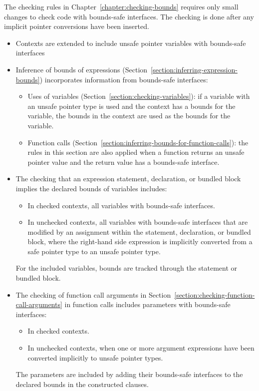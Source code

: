 The checking rules in Chapter~\ref{chapter:checking-bounds} requires
only small changes to check code with bounds-safe interfaces.  The
checking is done after any implicit pointer conversions have been
inserted.
\begin{itemize}
\item Contexts are extended to include unsafe pointer variables with
      bounds-safe interfaces
\item Inference of bounds of expressions (Section~\ref{section:inferring-expression-bounds}) incorporates information from bounds-safe interfaces:
\begin{itemize}
\item Uses of variables (Section~\ref{section:checking-variables}): 
      if a variable with an unsafe pointer type is used and the context has
      a bounds for the variable, the bounds in the context are used as the bounds
      for the variable.
\item Function calls (Section~\ref{section:inferring-bounds-for-function-calls}): 
      the rules in this section are also applied when a function returns an unsafe 
      pointer value and the return value has a bounds-safe interface.
\end{itemize}
\item The checking that an expression statement, declaration, or bundled
      block implies the declared bounds of variables includes:
\begin{itemize}
\item In checked contexts, all variables with bounds-safe interfaces.
\item In unchecked contexts, all variables with bounds-safe interfaces
      that are modified by an assignment within the statement, declaration,
      or bundled block, where the right-hand side expression
      is implicitly converted from a safe pointer type to an unsafe pointer type.
\end{itemize}
For the included variables, bounds are tracked through the statement or
bundled block.
\item The checking of function call arguments in
      Section~\ref{section:checking-function-call-arguments} 
      in function calls includes parameters with bounds-safe interfaces: 
\begin{itemize}
\item In checked contexts.
\item In unchecked contexts, when one or more argument expressions have been 
      converted implicitly to unsafe pointer types.
\end{itemize}
The parameters are included by adding their bounds-safe interfaces to the
declared bounds in the constructed  clauses.
\end{itemize}

